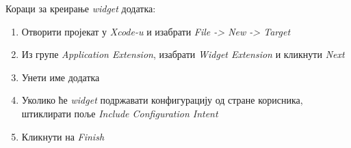 \documentclass[12pt,oneside]{memoir}
\begin{document}
\indent Кораци за креирање \textit{widget} додатка:
\begin{enumerate}
    \item Отворити пројекат у \textit{Xcode-u} и изабрати \textit{File -> New -> Target}
    \item Из групе \textit{Application Extension}, изабрати \textit{Widget Extension} и кликнути \textit{Next}
    \item Унети име додатка
    \item Уколико ће \textit{widget} подржавати конфигурацију од стране корисника, штиклирати поље \textit{Include Configuration Intent}
    \item Кликнути на \textit{Finish}
\end{enumerate}
\end{document}
